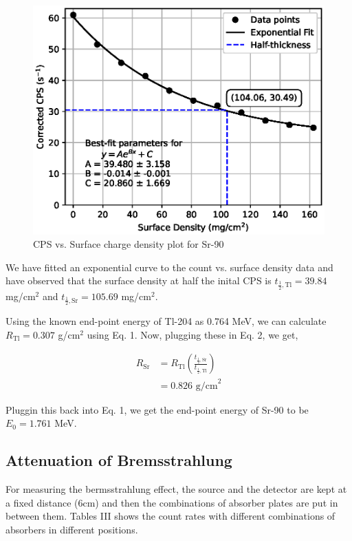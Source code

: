 \begin{figure}
    \centering
    \includegraphics[width=1\columnwidth]{images/Sr.eps}
    \caption{CPS vs. Surface charge density plot for Sr-90}
    \label{2}
\end{figure}

We have fitted an exponential curve to the count vs. surface density data and have observed that the surface density at half the inital CPS is $t_{\frac{1}{2}, \text{Tl}} = 39.84$ mg/cm$^2$ and $t_{\frac{1}{2}, \text{Sr}} = 105.69$ mg/cm$^2$.

Using the known end-point energy of Tl-204 as 0.764 MeV, we can calculate $R_\text{Tl} = 0.307$ g/cm$^2$ using Eq. 1. Now, plugging these in Eq. 2, we get,

\begin{align*}
    R_{\text{Sr}} &= R_{\text{Tl}} \left(\frac{t_{\frac{1}{2},\text{Sr}}}{t_{\frac{1}{2},\text{Tl}}}\right)\\
    &= 0.826 \text{ g/cm}^2
\end{align*}

Pluggin this back into Eq. 1, we get the end-point energy of Sr-90 to be $E_0=1.761$ MeV.

\subsection{Attenuation of Bremsstrahlung}

For measuring the bermsstrahlung effect, the
source and the detector are kept at a fixed distance (6cm)
and then the combinations of absorber plates are put in between them.
Tables III shows the count rates with different combinations of absorbers in different positions.


